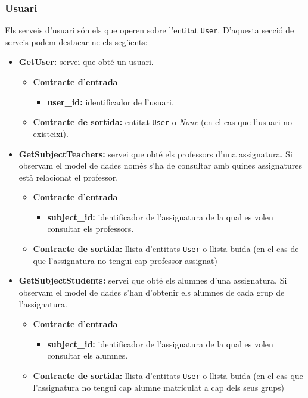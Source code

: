 	\subsubsection{Usuari}
			
		Els serveis d'usuari són els que operen sobre l'entitat \texttt{User}. D'aquesta secció de serveis podem destacar-ne els següents:
		
		\begin{itemize}
		
			\item \textbf{GetUser:} servei que obté un usuari.
				\begin{itemize}
					\item \textbf{Contracte d'entrada}
						\begin{itemize}
							\item \textbf{user\_id:} identificador de l'usuari.
						\end{itemize}
					\item \textbf{Contracte de sortida:} entitat \texttt{User} o \emph{None} (en el cas que l'usuari no existeixi).
				\end{itemize}
		
			\item \textbf{GetSubjectTeachers:} servei que obté els professors d'una assignatura. Si observam el model de dades només s'ha de consultar amb quines assignatures està relacionat el professor.
				\begin{itemize}
					\item \textbf{Contracte d'entrada}
						\begin{itemize}
							\item \textbf{subject\_id:} identificador de l'assignatura de la qual es volen consultar els professors.
						\end{itemize}
					\item \textbf{Contracte de sortida:} llista d'entitats \texttt{User} o llista buida (en el cas de que l'assignatura no tengui cap professor assignat)
				\end{itemize}
			
			\item \textbf{GetSubjectStudents:} servei que obté els alumnes d'una assignatura. Si observam el model de dades s'han d'obtenir els alumnes de cada grup de l'assignatura.
				\begin{itemize}
					\item \textbf{Contracte d'entrada}
						\begin{itemize}
							\item \textbf{subject\_id:} identificador de l'assignatura de la qual es volen consultar els alumnes.
						\end{itemize}
					\item \textbf{Contracte de sortida:} llista d'entitats \texttt{User} o llista buida (en el cas que l'assignatura no tengui cap alumne matriculat a cap dels seus grups)
				\end{itemize}
				

\end{itemize}
